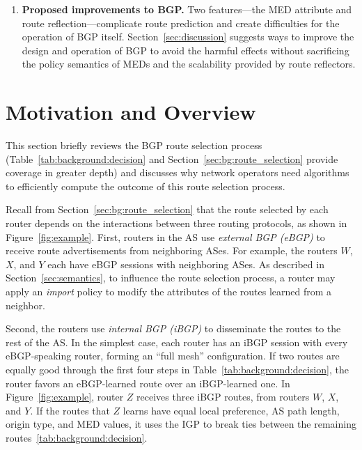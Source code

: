 \begin{enumerate}
\item \textbf{Proposed improvements to BGP.} 
Two features---the MED attribute and route reflection---complicate route
prediction and create difficulties for the operation of BGP itself.
Section~\ref{sec:discussion} suggests ways to improve the design and
operation of BGP to avoid the harmful effects without sacrificing the
policy semantics of MEDs and the scalability provided by route
reflectors.
\end{enumerate}


\section{Motivation and Overview}

This section briefly reviews the BGP route selection process
(Table~\ref{tab:background:decision} and
Section~\ref{sec:bg:route_selection} provide coverage in greater 
depth) and discusses why network operators need algorithms to
efficiently compute the outcome of this route selection process.

Recall from Section~\ref{sec:bg:route_selection} that the route selected
by each router depends on the interactions between three routing
protocols, as shown in Figure~\ref{fig:example}.  First, routers in the
AS use {\em external BGP (eBGP)} to receive route advertisements from
neighboring ASes.  For example, the routers $W$, $X$, and $Y$ each have
eBGP sessions with neighboring ASes.  As described in
Section~\ref{sec:semantics}, to influence the route selection process,
a router may apply an {\em import\/} policy to modify the attributes of
the routes learned from a neighbor.

Second, the routers use {\em internal BGP (iBGP)} to disseminate the routes to
the rest of the AS.  In the simplest case, each router has an iBGP
session with every eBGP-speaking router, forming an ``full mesh''
configuration.  If two routes are equally good through the first four
steps in Table~\ref{tab:background:decision}, the router favors an
eBGP-learned route over an iBGP-learned one.  In
Figure~\ref{fig:example}, router $Z$ receives three iBGP routes, from
routers $W$, $X$, and $Y$. If the routes that $Z$ learns have equal
local preference, AS path length, origin type, and MED values, it uses
the IGP to break ties between the remaining
routes~\ref{tab:background:decision}.

